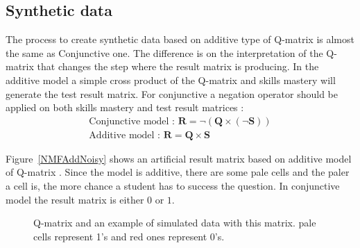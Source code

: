 \subsection{Synthetic data}

The process to create synthetic data based on additive type of Q-matrix is almost the same as Conjunctive one. The difference is on the interpretation of the Q-matrix that changes the step where the result matrix is producing. In the additive model a simple cross product of the Q-matrix and skills mastery will generate the test result matrix. For conjunctive a negation operator should be applied on both skills mastery and test result matrices : 
\begin{equation}
\begin{array}{c}
\text{Conjunctive model :   } \mathbf{R}=\neg\left(\mathbf{Q}\times\left(\neg\mathbf{S}\right)\right)\\
\text{Additive model :   } \mathbf{R}=\mathbf{Q}\times\mathbf{S}
\end{array}
\label{NMF_GEN_EQ}
\end{equation}

Figure~\ref{NMFAddNoisy} shows an artificial result matrix based on additive model of Q-matrix . Since the model is additive, there are some pale cells and the paler a cell is, the more chance a student has to success the question. In conjunctive model the result matrix is either $0$ or $1$. 


\begin{figure}[ht]
\centering

\quad
\caption{Q-matrix and an example of simulated data with this matrix.  pale cells represent 1's and red ones represent 0's.}
\label{figqmatrixandResutM}
\end{figure}



